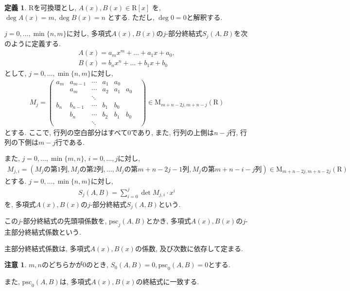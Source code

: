 \documentclass[dvipdfmx]{jsarticle}
\newcommand{\psc}{\mathrm{psc}}
\theoremstyle{definition}
\newtheorem{definition}{定義}[section]
\newtheorem{remark}{注意}[section]
\begin{document}
\begin{definition}
$\mathrm{R}$を可換環とし, $A(x), B(x) \in \mathrm{R}[x]$ を, $\deg A(x) = m, \deg B(x) = n$ とする. ただし, $\deg 0 = 0$と解釈する.

$j = 0, \dots, \min\{n, m\}$に対し, 多項式$A(x), B(x)$の$j$-部分終結式$S_j(A, B)$を次のように定義する.
\begin{align*}
A(x) = a_m x^m + \dots + a_1 x + a_0, \\
B(x) = b_n x^n + \dots + b_1 x + b_0 
\end{align*}
として, $j = 0, \dots, \min\{n,m\}$に対し, 
\begin{align*}
M_j = 
\begin{pmatrix}
a_m & a_{m-1} & \cdots & a_1 & a_0 &    &  \\
     &  a_m     & \cdots & a_2 & a_1& a_0 &  \\
     &   & \ddots &  & & \\
b_n & b_{n-1} & \cdots & b_1 & b_0 &    & \\
     &  b_n     & \cdots & b_2 & b_1& b_0 & \\
     &   & \ddots &  & & 
\end{pmatrix}
\in \mathrm{M}_{m+n-2j, m+n-j}(\mathrm{R})
\end{align*}
とする. ここで, 行列の空白部分はすべて0であり, また, 行列の上側は$n-j$行, 行列の下側は$m-j$行である.

また, $j = 0, \dots, \min\{m,n\}$, $i = 0, \dots, j$に対し, 
\begin{align*}
M_{j,i} = (\text{$M_j$の第$1$列}, \text{$M_j$の第$2$列}, \dots ,\text{$M_j$の第$m+n-2j-1$列}, \text{$M_j$の第$m+n-i-j$列})
\in \mathrm{M}_{m+n-2j, m+n-2j}(\mathrm{R})
\end{align*}
とする. $j = 0, \dots, \min\{n, m\}$に対し, 
\begin{align*}
S_j(A, B) = \sum_{i=0}^j \det M_{j, i} \cdot x^i 
\end{align*}
を, 多項式$A(x), B(x)$の$j$-部分終結式$S_j(A, B)$という.

この$j$-部分終結式の先頭項係数を, $\psc_j(A,B)$とかき, 多項式$A(x), B(x)$の$j$-主部分終結式係数という.
\end{definition}


主部分終結式係数は, 多項式$A(x), B(x)$の係数, 及び次数に依存して定まる.

\begin{remark}
$m,n$のどちらかが0のとき, 
$S_0(A,B) = 0, \psc_0(A,B) = 0$とする.

また, $\psc_0(A,B)$は, 多項式$A(x), B(x)$の終結式に一致する.
\end{remark}
\end{document}
